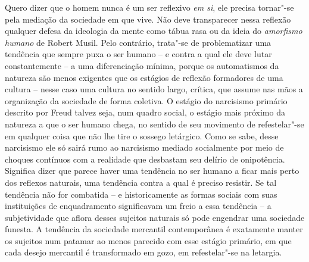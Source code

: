 Quero dizer que o homem nunca é um ser reflexivo \emph{em si}, ele
precisa tornar"-se pela mediação da sociedade em que vive. Não deve
transparecer nessa reflexão qualquer defesa da ideologia da mente como
tábua rasa ou da ideia do \emph{amorfismo humano} de Robert Musil. Pelo
contrário, trata"-se de problematizar uma tendência que sempre puxa o ser
humano -- e contra a qual ele deve lutar constantemente -- a uma
diferenciação mínima, porque os automatismos da natureza são menos
exigentes que os estágios de reflexão formadores de uma cultura -- nesse
caso uma cultura no sentido largo, crítica, que assume nas mãos a
organização da sociedade de forma coletiva. O estágio do
narcisismo primário descrito por Freud talvez seja, num quadro social, o
estágio mais próximo da natureza a que o ser humano chega, no sentido de
seu movimento de refestelar"-se em qualquer coisa que não lhe tire o
sossego letárgico. Como se sabe, desse narcisismo ele só sairá rumo ao
narcisismo mediado socialmente por meio de choques contínuos com a
realidade que desbastam seu delírio de onipotência. Significa dizer que
parece haver uma tendência no ser humano a ficar mais perto dos reflexos
naturais, uma tendência contra a qual é preciso resistir. Se tal
tendência não for combatida -- e historicamente as formas sociais com
suas instituições de enquadramento significavam um freio a essa
tendência -- a subjetividade que aflora desses sujeitos naturais só pode
engendrar uma sociedade funesta. A tendência da sociedade mercantil
contemporânea é exatamente manter os sujeitos num patamar ao menos
parecido com esse estágio primário, em que cada desejo mercantil é
transformado em gozo, em refestelar"-se na letargia.

